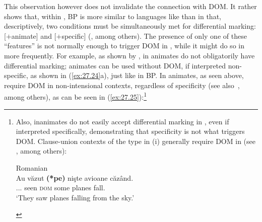 \documentclass[output=paper]{langsci/langscibook}
\begin{document}
This observation however does not invalidate the connection with DOM\@. It
rather shows that, within , \gls{BP} is
more similar to languages like  than  in that,
descriptively, two conditions must be simultaneously met for differential
marking: [$+$animate] and [$+$specific]
(\citealt{Farkas1985,Dobrovie-Sorin1994,IrimiaCyrino2015}, among others). The
presence of only one of these \enquote{features} is not normally enough to
trigger DOM in , while it might
do so in  more frequently. For example, as shown by
\citet{IrimiaCyrino2015,IrimiaCyrino2017}, in  animates do not
obligatorily have differential marking; animates can be used without
DOM, if interpreted non-specific, as shown in
(\ref{ex:27.24}a), just like  in BP\@. In 
animates, as seen above, require DOM in
non-intensional contexts, regardless of specificity (see
also~\citealt{Lopez2012,Leonetti2008}, among others), as can be seen in
(\ref{ex:27.25}):\footnote{Also, inanimates do not easily accept
    differential marking in , even if interpreted specifically,
    demonstrating that specificity is not what triggers DOM\@. Clause-union
    contexts of the type in (i) generally require DOM in  (see \citealt{Lopez2012}, among others):

\begin{exe}
     Romanian\\
        \gll Au văzut \textbf{(*pe)} nişte avioane căzând.\\
            \Aux.\Tpl.\Prs.\Indic{} seen \hphantom{(*}\textsc{dom} some planes fall.\Ger{}\\
        \glt `They saw planes falling from the sky.'
\end{exe}}
\end{document}
